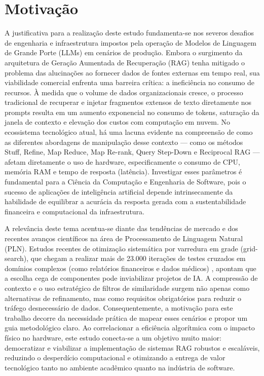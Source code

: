 \newpage
\section{Motivação}
\label{sc:motivacao}


A justificativa para a realização deste estudo fundamenta-se nos severos desafios de engenharia e infraestrutura impostos pela operação de Modelos de Linguagem de Grande Porte (LLMs) em cenários de produção. Embora o surgimento da arquitetura de Geração Aumentada de Recuperação (RAG) tenha mitigado o problema das alucinações ao fornecer dados de fontes externas em tempo real, sua viabilidade comercial enfrenta uma barreira crítica: a ineficiência no consumo de recursos. À medida que o volume de dados organizacionais cresce, o processo tradicional de recuperar e injetar fragmentos extensos de texto diretamente nos prompts resulta em um aumento exponencial no consumo de tokens, saturação da janela de contexto e elevação dos custos com computação em nuvem. No ecossistema tecnológico atual, há uma lacuna evidente na compreensão de como as diferentes abordagens de manipulação desse contexto — como os métodos Stuff, Refine, Map Reduce, Map Re-rank, Query Step-Down e Reciprocal RAG \cite{topsakal2023langchain} — afetam diretamente o uso de hardware, especificamente o consumo de CPU, memória RAM e tempo de resposta (latência). Investigar esses parâmetros é fundamental para a Ciência da Computação e Engenharia de Software, pois o sucesso de aplicações de inteligência artificial depende intrinsecamente da habilidade de equilibrar a acurácia da resposta gerada com a sustentabilidade financeira e computacional da infraestrutura.

A relevância deste tema acentua-se diante das tendências de mercado e dos recentes avanços científicos na área de Processamento de Linguagem Natural (PLN). Estudos recentes de otimização sistemática por varredura em grade (grid-search), que chegam a realizar mais de 23.000 iterações de testes cruzados em domínios complexos (como relatórios financeiros e dados médicos) \cite{sakar2025rag}, apontam que a escolha cega de componentes pode inviabilizar projetos de IA. A compressão de contexto e o uso estratégico de filtros de similaridade surgem não apenas como alternativas de refinamento, mas como requisitos obrigatórios para reduzir o tráfego desnecessário de dados. Consequentemente, a motivação para este trabalho decorre da necessidade prática de mapear esses cenários e propor um guia metodológico claro. Ao correlacionar a eficiência algorítmica com o impacto físico no hardware, este estudo conecta-se a um objetivo muito maior: democratizar e viabilizar a implementação de sistemas RAG robustos e escaláveis, reduzindo o desperdício computacional e otimizando a entrega de valor tecnológico tanto no ambiente acadêmico quanto na indústria de software.